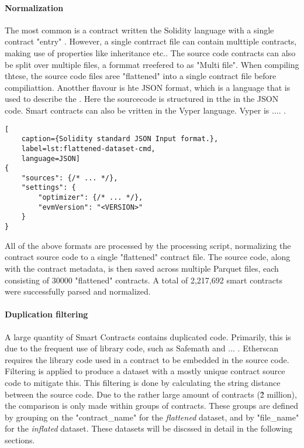 \paragraph{Normalization}
The most common is a contract written the Solidity language with  a single contract "entry"  . However, a single contrract file can contain multtiple contracts, making use of properties like inheritance etc.. The source code contracts can also be split over multiple files, a formmat rreefered to as "Multi file". When compiling thtese, the source code files aree "flattened" into a single contract file before compiliattion. Anotther flavour is hte JSON format, which is a language that is used to describe the . Here the sourcecode is structured in tthe in the JSON code. Smart contracts can also be vritten in the Vyper language. Vyper is .... .


\begin{lstlisting}[
    caption={Solidity standard JSON Input format.},
    label=lst:flattened-dataset-cmd,
    language=JSON]
{
    "sources": {/* ... */},
    "settings": {
        "optimizer": {/* ... */},
        "evmVersion": "<VERSION>"
    }
}
\end{lstlisting}

All of the above formats are processed by the processing script, normalizing the contract source code to a single "flattened" contract file. The source code, along with the contract metadata, is then saved across multiple Parquet files, each consisting of 30000 "flattened" contracts. A total of 2,217,692 smart contracts were successfully parsed and normalized.

\paragraph{Duplication filtering}
\label{sec:duplication-filtering}
A large quantity of Smart Contracts contains duplicated code. Primarily, this is due to the frequent use of library code, such as Safemath and ... . Etherscan requires the library code used in a contract to be embedded in the source code. Filtering is applied to produce a dataset with a mostly unique contract source code to mitigate this. This filtering is done by calculating the string distance between the source code. Due to the rather large amount of contracts (\~2 million), the comparison is only made within groups of contracts. These groups are defined by grouping on the "contract\_name" for the \textit{flattened} dataset, and by "file\_name" for the \textit{inflated} dataset. These datasets will be discssed in detail in the following sections.

